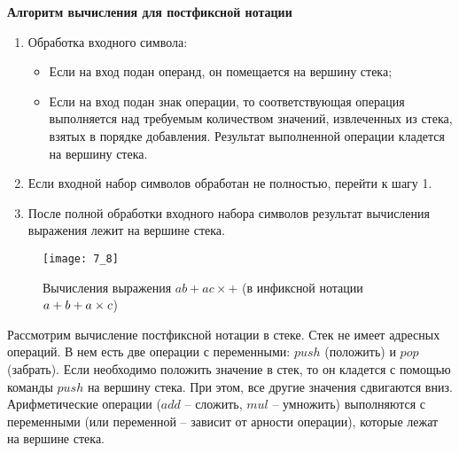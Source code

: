 \begin{center}
  \textbf{Алгоритм вычисления для постфиксной нотации}
\end{center}
\begin{enumerate}
  \item Обработка входного символа:
  \begin{itemize}
    \item Если на вход подан операнд, он помещается на вершину стека;
    \item Если на вход подан знак операции, то соответствующая операция выполняется над требуемым количеством значений, извлеченных из стека, взятых в порядке добавления. Результат выполненной операции кладется на вершину стека.
  \end{itemize}
  \item Если входной набор символов обработан не полностью, перейти к шагу 1.
  \item После полной обработки входного набора символов результат вычисления выражения лежит на вершине стека.
\end{enumerate}

\begin{figure}[h]
\centering
\texttt{[image: 7\_8]}
\caption{Вычисления выражения $ab+ac\times +$ (в инфиксной нотации $a\hm+b\hm+a\times c$)}
\end{figure}
Рассмотрим вычисление постфиксной нотации в стеке. Стек не имеет адресных операций. В нем есть две операции с переменными: $push$ (положить) и $pop$ (забрать). Если необходимо положить значение в стек, то он кладется с помощью команды $push$ на вершину стека. При этом, все другие значения сдвигаются вниз. Арифметические операции ($add$ -- сложить, $mul$ -- умножить) выполняются с переменными (или переменной -- зависит от арности операции), которые лежат на вершине стека.
